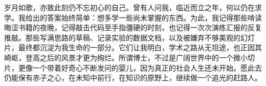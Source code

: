 岁月如歌，亦致此刻仍不忘初心的自己。曾有人问我，临近而立之年，何以仍在求学。我给出的答案始终简单：想多学一些尚未掌握的东西。为此，我记得那些啃读晦涩书籍的夜晚，记得敲击代码至手指僵硬的时刻，也记得一次次演练汇报的反复推敲。那些写满思路的草稿、记录实验的数据文档，以及被嫌弃不够美观的幻灯片，最终都沉淀为我生命的一部分。它们让我明白，学术之路从无坦途，也正因其崎岖，登高之后的风景才更为绚烂。所谓博士，不过是广阔世界中的一个微小切片，更像一个带着好奇心不断发问的婴儿，因为真正的社会人生还未开始。愿此去仍能保有赤子之心，在未知中前行，在知识的原野上，继续做一个追光的赶路人。
